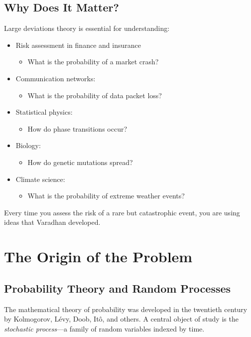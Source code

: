 \subsection{Why Does It Matter?}

Large deviations theory is essential for understanding:

\begin{itemize}
\item Risk assessment in finance and insurance
\begin{itemize}
\item What is the probability of a market crash?
\end{itemize}
\item Communication networks:
\begin{itemize}
\item What is the probability of data packet loss?
\end{itemize}
\item Statistical physics:
\begin{itemize}
\item How do phase transitions occur?
\end{itemize}
\item Biology:
\begin{itemize}
\item How do genetic mutations spread?
\end{itemize}
\item Climate science:
\begin{itemize}
\item What is the probability of extreme weather events?
\end{itemize}
\end{itemize}

Every time you assess the risk of a rare but catastrophic event, you are using ideas that Varadhan developed.

\section{The Origin of the Problem}

\subsection{Probability Theory and Random Processes}

The mathematical theory of probability was developed in the twentieth century by Kolmogorov, L\'evy, Doob, It\^o, and others. A central object of study is the \emph{stochastic process}---a family of random variables indexed by time.

